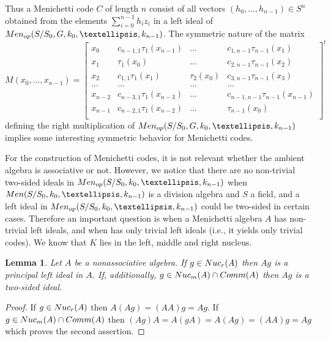 \documentclass[11pt]{amsart}
\theoremstyle{plain}
\newtheorem{lemma}[theorem]{Lemma}
\theoremstyle{definition}
\begin{document}
 Thus a Menichetti code
$C$ of length $n$ consist of all vectors $(h_0,\dots,h_{n-1})\in S^n$ obtained from the elements
 $\sum_{i=0}^{n-1}h_iz_i$ in a left  ideal  of ${\rm Men}_{op}(S/S_0,G, k_0,\dots,k_{n-1})$. The symmetric nature of the matrix
  \[ M(x_0,\dots,x_{n-1})=\left [\begin {array}{cccccc}
x_0 &  c_{{n-1},1}\tau_1(x_{n-1}) & ... & c_{1,{n-1}} \tau_{n-1}(x_{1})\\
x_1 & \tau_1(x_0) & ... &  c_{2,{n-1}} \tau_{n-1}(x_{2})\\
x_2 & c_{1,1}\tau_1(x_{1}) & \tau_2(x_0) & c_{3,{n-1}} \tau_{n-1}(x_{3})\\
...& ...  & ... & ...\\
x_{n-2} &  c_{n-3,1}\tau_1(x_{n-3})  & ...& c_{{n-1},{n-1}} \tau_{n-1}(x_{n-1})\\
x_{n-1} &  c_{n-2,1}\tau_1(x_{n-2})  & ...& \tau_{n-1}(x_{0})\\
\end {array}\right ]^t
 \]
 defining the right multiplication of ${\rm Men}_{op}(S/S_0,G, k_0,\dots,k_{n-1})$ implies some interesting symmetric behavior for
 Menichetti codes.



For the construction of Menichetti codes, it is not relevant whether the ambient algebra is associative or not.
However, we notice that there are no non-trivial two-sided ideals in ${\rm Men}_{op}(S/S_0, k_0,\dots,k_{n-1})$ when ${\rm Men}(S/S_0, k_0,\dots,k_{n-1})$ is a division algebra and $S$ a field, and a left ideal in ${\rm Men}_{op}(S/S_0, k_0,\dots,k_{n-1})$ could be two-sided in certain cases.
Therefore an important question is when a Menichetti algebra $A$ has non-trivial left ideals, and  when has only trivial left ideals (i.e., it yields only trivial codes). We know that $K$ lies in the left, middle and right nucleus.


\begin{lemma}\label{le:trivial}
Let $A$ be a nonassociative algebra. If $g\in {\rm Nuc}_r(A)$ then $Ag$ is a principal left ideal in $A$.
If, additionally, $g\in {\rm Nuc}_m(A)\cap {\rm Comm}(A)$ then $Ag$ is a two-sided ideal.
\end{lemma}

\begin{proof}
If $g\in {\rm Nuc}_r(A)$ then $A(Ag)=(AA)g=Ag$. If $g\in {\rm Nuc}_m(A)\cap {\rm Comm}(A)$ then $(Ag)A=A(gA)=A(Ag)=(AA)g=Ag$ which proves the second assertion.
\end{proof}
\end{document}
